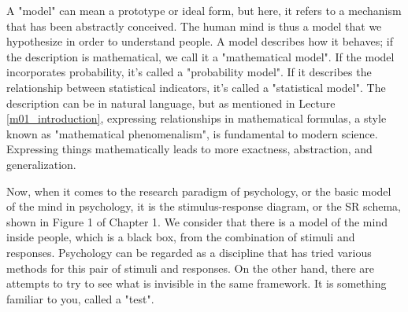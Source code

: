 \documentclass{ltjbook}
\begin{document}
A "model" can mean a prototype or ideal form, but here, it refers to a mechanism that has been abstractly conceived. The human mind is thus a model that we hypothesize in order to understand people. A model describes how it behaves; if the description is mathematical, we call it a "mathematical model". If the model incorporates probability, it's called a "probability model". If it describes the relationship between statistical indicators, it's called a "statistical model". The description can be in natural language, but as mentioned in Lecture \ref{m01_introduction}, expressing relationships in mathematical formulas, a style known as "mathematical phenomenalism", is fundamental to modern science. Expressing things mathematically leads to more exactness, abstraction, and generalization.

Now, when it comes to the research paradigm of psychology, or the basic model of the mind in psychology, it is the stimulus-response diagram, or the SR schema, shown in Figure 1 of Chapter 1. We consider that there is a model of the mind inside people, which is a black box, from the combination of stimuli and responses. Psychology can be regarded as a discipline that has tried various methods for this pair of stimuli and responses. On the other hand, there are attempts to try to see what is invisible in the same framework. It is something familiar to you, called a "test".
\end{document}
